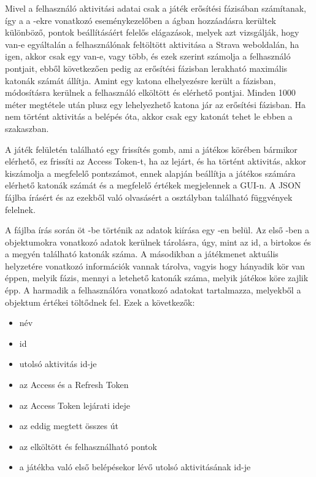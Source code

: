 Mivel a felhasználó aktivitási adatai csak a játék erősítési fázisában számítanak, így a  a -ekre vonatkozó eseménykezelőben a  ágban hozzáadásra kerültek különböző, pontok beállításáért felelős elágazások, melyek azt vizsgálják, hogy van-e egyáltalán a felhasználónak feltöltött aktivitása a Strava weboldalán, ha igen, akkor csak egy van-e, vagy több, és ezek szerint számolja a felhasználó pontjait, ebből következően pedig az erősítési fázisban lerakható maximális katonák számát állítja.
Amint egy katona elhelyezésre került a  fázisban, módosításra kerülnek a felhasználó elköltött és elérhető pontjai.
Minden 1000 méter megtétele után plusz egy lehelyezhető katona jár az erősítési fázisban.
Ha nem történt aktivitás a belépés óta, akkor csak egy katonát tehet le ebben a szakaszban. 

A játék felületén található egy frissítés gomb, ami a játékos körében bármikor elérhető, ez frissíti az Access Token-t, ha az lejárt, és ha történt aktivitás, akkor kiszámolja a megfelelő pontszámot, ennek alapján beállítja a játékos számára elérhető katonák számát és a megfelelő értékek megjelennek a GUI-n.
A JSON fájlba írásért és az ezekből való olvasásért a  osztályban található függvények felelnek. 

A fájlba írás során öt -be történik az adatok kiírása egy -en belül. Az első -ben a  objektumokra vonatkozó adatok kerülnek tárolásra, úgy, mint az id, a birtokos és a megyén található katonák száma.
A másodikban a játékmenet aktuális helyzetére vonatkozó információk vannak tárolva, vagyis hogy hányadik kör van éppen, melyik fázis, mennyi a letehető katonák száma, melyik játékos köre zajlik épp.
A harmadik  a felhasználóra vonatkozó adatokat tartalmazza, melyekből a  objektum értékei töltődnek fel. Ezek a következők:

\begin{itemize}
\setlength\itemsep{0em}
\item név
\item id
\item utolsó aktivitás id-je
\item az Access és a Refresh Token
\item az Access Token lejárati ideje
\item az eddig megtett összes út
\item az elköltött és felhasználható pontok
\item a játékba való első belépésekor lévő utolsó aktivitásának id-je
\end{itemize}

